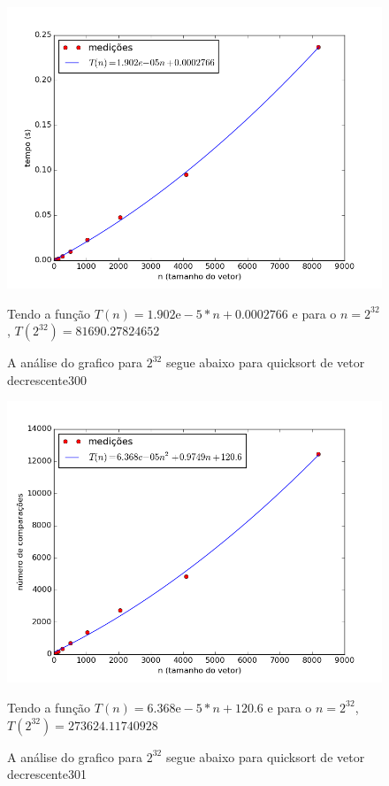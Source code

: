 \documentclass[12pt,a4paper,twoside]{report}
\begin{document}
\clearpage


\begin{figure}[ht]
\centering \includegraphics[scale=0.8]{../quicksort/imagens/quicksortQuaseDecresc300.png}
\caption{A análise do grafico para $2^{32}$ segue abaixo para quicksort de vetor decrescente300}

Tendo a função $T(n) = 1.902\mathrm{e}-5*n+0.0002766$ e para o $n =2^{32}$, $T(2^{32}) = 81690.27824652$ 

\label{fig:quicksortQuaseDecresc300}
\end{figure}

\begin{figure}[ht]
\centering \includegraphics[scale=0.8]{../quicksort/imagens/quicksortQuaseDecresc301.png}
\caption{A análise do grafico para $2^{32}$ segue abaixo para quicksort de vetor decrescente301}

Tendo a função $T(n) = 6.368\mathrm{e}-5*n+120.6$ e para o $n =2^{32}$, $T(2^{32}) = 273624.11740928$ 

\label{fig:quicksortQuaseDecresc301}
\end{figure}
\end{document}
